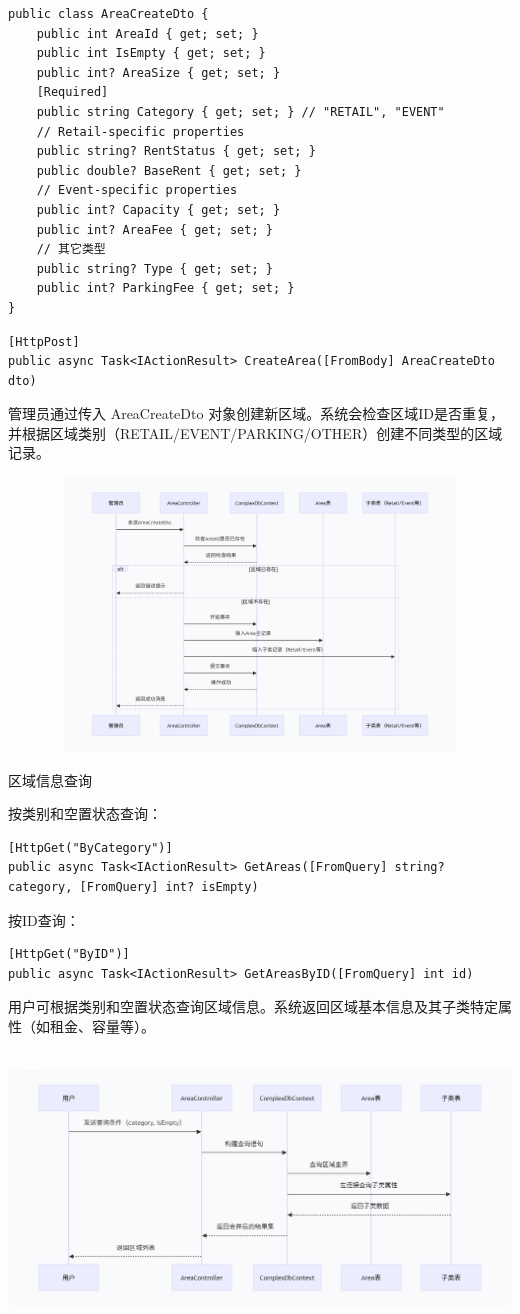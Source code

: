 \documentclass[]{article}
\let\oldincludegraphics\includegraphics
\renewcommand{\includegraphics}[2][]{%
  \begin{center}\oldincludegraphics[#1]{#2}\end{center}%
}
\begin{document}
\begin{verbatim}
public class AreaCreateDto {
    public int AreaId { get; set; }
    public int IsEmpty { get; set; }
    public int? AreaSize { get; set; }
    [Required]
    public string Category { get; set; } // "RETAIL", "EVENT"
    // Retail-specific properties
    public string? RentStatus { get; set; }
    public double? BaseRent { get; set; }
    // Event-specific properties
    public int? Capacity { get; set; }
    public int? AreaFee { get; set; }
    // 其它类型
    public string? Type { get; set; }
    public int? ParkingFee { get; set; }
}
\end{verbatim}

\begin{verbatim}
[HttpPost]
public async Task<IActionResult> CreateArea([FromBody] AreaCreateDto dto)
\end{verbatim}
管理员通过传入 AreaCreateDto 对象创建新区域。系统会检查区域ID是否重复，并根据区域类别（RETAIL/EVENT/PARKING/OTHER）创建不同类型的区域记录。

\includegraphics[width=5.64167in,height=2.86458in]{media/media/image_2-3-5.png}

区域信息查询

按类别和空置状态查询：
\begin{verbatim}
[HttpGet("ByCategory")]
public async Task<IActionResult> GetAreas([FromQuery] string? category, [FromQuery] int? isEmpty)
\end{verbatim}
按ID查询：
\begin{verbatim}
[HttpGet("ByID")]
public async Task<IActionResult> GetAreasByID([FromQuery] int id)
\end{verbatim}
用户可根据类别和空置状态查询区域信息。系统返回区域基本信息及其子类特定属性（如租金、容量等）。

\includegraphics[width=5.64167in,height=2.86458in]{media/media/image_2-3-6.png}
\end{document}
